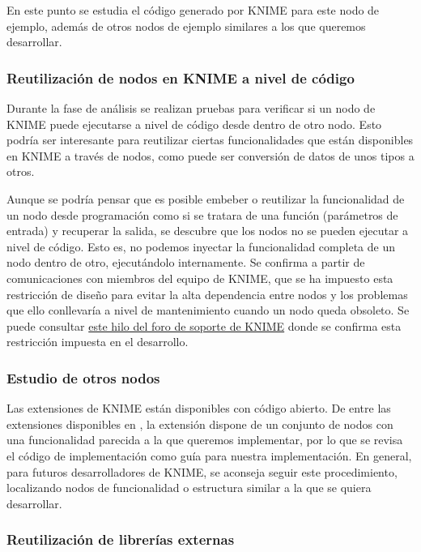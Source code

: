 En este punto se estudia el código generado por KNIME para este nodo de ejemplo, además de otros nodos de ejemplo similares 
a los que queremos desarrollar. 


\subsubsection{Reutilización de nodos en KNIME a nivel de código}

Durante la fase de análisis se realizan pruebas para verificar si un nodo de KNIME puede ejecutarse a nivel de código desde 
dentro de otro nodo. Esto podría ser interesante para reutilizar ciertas funcionalidades que están disponibles en KNIME 
a través de nodos, como puede ser conversión de datos de unos tipos a otros. 
\

Aunque se podría pensar que es posible embeber o reutilizar la funcionalidad de un nodo desde programación como si 
se tratara de una función (parámetros de entrada) y recuperar la salida, se descubre que los nodos no se pueden ejecutar a nivel de código. Esto es, no podemos inyectar la funcionalidad completa de un nodo 
dentro de otro, ejecutándolo internamente. Se confirma a partir de comunicaciones con miembros del equipo de KNIME, que se ha 
impuesto esta restricción de diseño para evitar la alta dependencia entre nodos y los problemas que ello conllevaría a nivel 
de mantenimiento cuando un nodo queda obsoleto. Se puede consultar \href{https://forum.knime.com/t/using-node-without-gui/2044/8}{este hilo del foro de soporte de KNIME} donde se confirma esta restricción impuesta en el desarrollo. 
\

\subsubsection{Estudio de otros nodos}

Las extensiones de KNIME están disponibles con código abierto. De entre las extensiones disponibles en , la extensión 
\href{https://hub.knime.com/knime/extensions/org.knime.features.ext.twitter/latest}{} dispone de un 
conjunto de nodos con una funcionalidad parecida a la que queremos implementar, por lo que se revisa el código de implementación
como guía para nuestra implementación. En general, para futuros desarrolladores de KNIME, se aconseja seguir este procedimiento, 
localizando nodos de funcionalidad o estructura similar a la que se quiera desarrollar. 

\subsubsection{Reutilización de librerías externas}

